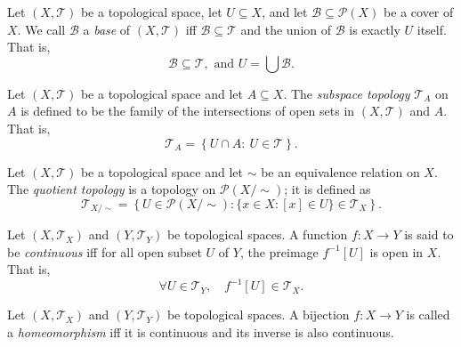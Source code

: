 \begin{definition}
	[basis]
	\label{def: basis}
	Let $(X, \mathcal T)$ be a topological space, let $U \subseteq X$, and let $\mathcal B \subseteq \mathcal P(X)$ be a cover of $X$. We call $\mathcal B$ a \textit{base} of $(X, \mathcal T)$ iff $\mathcal B \subseteq \mathcal T$ and the union of $\mathcal B$ is exactly $U$ itself. That is,
	$$
	\mathcal B \subseteq \mathcal T, \text{ and } U = \bigcup \mathcal B.
	$$
\end{definition}


\begin{definition}
	\label{def: subspace topology}
	Let $(X, \mathcal T)$ be a topological space and let $A \subseteq X$. The \textit{subspace topology} $\mathcal T_A$ on $A$ is defined to be the family of the intersections of open sets in $(X, \mathcal T)$ and $A$. That is,
	$$
	\mathcal T_A = \left\{ U \cap A : \ U \in \mathcal T \right\}.
	$$
\end{definition}


\begin{definition}
	\label{def: quotient topology}
	Let $(X, \mathcal T)$ be a topological space and let $\sim$ be an equivalence relation on $X$. The \textit{quotient topology} is a topology on $\mathcal P(X/ \sim)$; it is defined as
	$$
	\mathcal T_{X / \sim} = \left\{ U \in \mathcal P(X/\sim) : \{ x \in X: [x] \in U \} \in \mathcal T_X \right\}.
	$$
\end{definition}


\begin{definition}
	\label{def: continuous functions}
	Let $(X, \mathcal T_X)$ and $(Y, \mathcal T_Y)$ be topological spaces. A function $f: X \to Y$ is said to be \textit{continuous} iff for all open subset $U$ of $Y$, the preimage $f^{-1}[U]$ is open in $X$. That is,
	$$
	\forall U \in \mathcal T_{Y}, \quad f^{-1}[U] \in \mathcal T_X.
	$$
\end{definition}


\begin{definition}
	[homeomorphisms]
	\label{def: homomorphisms}
	Let $(X, \mathcal T_X)$ and $(Y, \mathcal T_Y)$ be topological spaces. A bijection $f: X \to Y$ is called a \textit{homeomorphism} iff it is continuous and its inverse is also continuous.
\end{definition}


